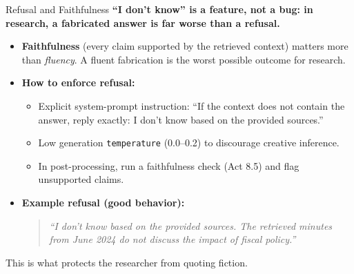 \begin{frame}{Refusal and Faithfulness}
\textbf{``I don't know'' is a feature, not a bug: in research, a fabricated answer is far worse than a refusal.}

\medskip
\begin{itemize}
\item \textbf{Faithfulness} (every claim supported by the retrieved context) matters more than \emph{fluency}. A fluent fabrication is the worst possible outcome for research.

\medskip
\item \textbf{How to enforce refusal:}
\begin{itemize}
    \item Explicit system-prompt instruction: ``If the context does not contain the answer, reply exactly: I don't know based on the provided sources.''
    \item Low generation \texttt{temperature} (0.0--0.2) to discourage creative inference.
    \item In post-processing, run a faithfulness check (Act 8.5) and flag unsupported claims.
\end{itemize}

\medskip
\item \textbf{Example refusal (good behavior):}
\begin{quote}
\small\itshape
``I don't know based on the provided sources. The retrieved minutes from June 2024 do not discuss the impact of fiscal policy.''
\end{quote}
\end{itemize}

\smallskip
\begin{takeawaybox}
This is what protects the researcher from quoting fiction.
\end{takeawaybox}
\end{frame}

